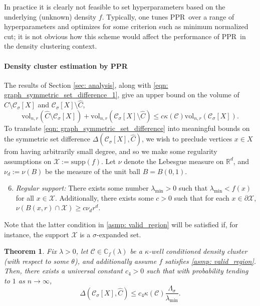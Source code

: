 \documentclass{article}
\newcommand{\vol}{\mathrm{vol}}
\newcommand{\Reals}{\mathbb{R}}
\newcommand{\Rd}{\Reals^d}
\newcommand{\1}{\mathbf{1}}
\newcommand{\Xbf}{X}             %
\newcommand{\Cbb}{\mathbb{C}}
\newcommand{\Cset}{\mathcal{C}}
\newcommand{\Csig}{\Cset_{\sigma}}
\newcommand{\Cest}{\widehat{C}}
\newcommand{\ppr}{{\sc PPR}}
\newcommand{\pprspace}{{\sc PPR~}}
\theoremstyle{aldenthm}
\newtheorem{theorem}{Theorem}
\theoremstyle{aldenrmrk}
\begin{document}
In practice it is clearly not feasible to set hyperparameters based on the underlying (unknown) density $f$. Typically, one tunes \pprspace over a range of hyperparameters and optimizes for some criterion such as minimum normalized cut; it is not obvious how this scheme would affect the performance of \pprspace in the density clustering context.

\paragraph{Density cluster estimation by \ppr}

The results of Section \ref{sec: analysis}, along with \eqref{eqn: graph_symmetric_set_difference_1}, give an upper bound on the volume of $\Cest \setminus \Csig[\Xbf]$ and $\Csig[\Xbf] \setminus \Cest$,
\begin{equation}
\label{eqn: graph_symmetric_set_difference}
\vol_{n,r}(\Cest \setminus \Csig[\Xbf]) + \vol_{n,r}(\Csig[\Xbf] \setminus \Cest) \leq c \kappa(\Cset) \vol_{n,r}(\Csig[\Xbf]).
\end{equation}
To translate \eqref{eqn: graph_symmetric_set_difference} into meaningful bounds on the symmetric set difference $\Delta(\Csig[\Xbf], \Cest)$, we wish to preclude vertices $x \in \Xbf$ from having arbitrarily small degree, and so we make some regularity assumptions on $\mathcal{X} := \mathrm{supp}(f)$. Let $\nu$ denote the Lebesgue measure on $\Rd$, and $\nu_d := \nu(B)$ be the measure of the unit ball $B = B(0,1)$.
\begin{enumerate}[label=(A\arabic*)]
	\setcounter{enumi}{5}
	\item 
	\label{asmp: valid_region}
	\emph{Regular support:} There exists some number $\lambda_{\min} > 0$ such that $\lambda_{\min} < f(x)$ for all $x \in \mathcal{X}$. Additionally, there exists some $c > 0$ such that for each $x \in \partial \mathcal{X}$, $\nu(B(x,r) \cap \mathcal{X}) \geq c \nu_d r^d$.
\end{enumerate}
Note that the latter condition in \ref{asmp: valid_region} will be satisfied if, for instance, the support $\mathcal{X}$ is a $\sigma$-expanded set.

\begin{theorem}
	\label{thm: misclassification_rate}
	Fix $\lambda > 0$, let $\Cset \in \Cbb_f(\lambda)$ be a $\kappa$-well conditioned density cluster (with respect to some $\theta$), and additionally assume $f$ satisfies \ref{asmp: valid_region}. Then, there exists a universal constant $c_4 > 0$ such that with probability tending to $1$ as $n \to \infty$, 
	\begin{equation}
	\label{eqn: misclassification_rate_ub}
	\Delta(\Csig[\Xbf], \Cest) \leq c_4 \kappa(\Cset) \frac{\Lambda_{\sigma}}{\lambda_{\min}}.
	\end{equation}
\end{theorem}
\end{document}
